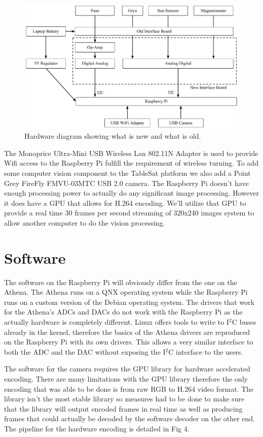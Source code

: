 \documentclass[conference, onecolumn, 12pt]{IEEEtran}
\begin{document}
\begin{figure}
\centering
\includegraphics[width=6.5in]{Hardware_diagram.pdf}
\caption{Hardware diagram showing what is new and what is old.}
\end{figure}

The Monoprice Ultra-Mini USB Wireless Lan 802.11N Adapter is used to provide Wifi access to the Raspberry Pi fulfill the requirement of wireless turning. To add some computer vision component to the TableSat platform we also add a Point Grey FireFly FMVU-03MTC USB 2.0 camera. The Raspberry Pi doesn't have enough processing power to actually do any significant image processing. However it does have a GPU that allows for H.264 encoding. We'll utilize that GPU to provide a real time 30 frames per second streaming of 320x240 images system to allow another computer to do the vision processing.

\section{Software}
The software on the Raspberry Pi will obviously differ from the one on the Athena. The Athena runs on a QNX operating system while the Raspberry Pi runs on a custom version of the Debian operating system. The drivers that work for the Athena's ADCs and DACs do not work with the Raspberry Pi as the actually hardware is completely different. Linux offers tools to write to I$^2$C buses already in the kernel, therefore the basics of the Athena drivers are reproduced on the Raspberry Pi with its own drivers. This allows a very similar interface to both the ADC and the DAC without exposing the I$^2$C interface to the users.

The software for the camera requires the GPU library for hardware accelerated encoding. There are many limitations with the GPU library therefore the only encoding that was able to be done is from raw RGB to H.264 video format. The library isn't the most stable library so measures had to be done to make sure that the library will output encoded frames in real time as well as producing frames that could actually be decoded by the software decoder on the other end. The pipeline for the hardware encoding is detailed in Fig 4.
\end{document}
